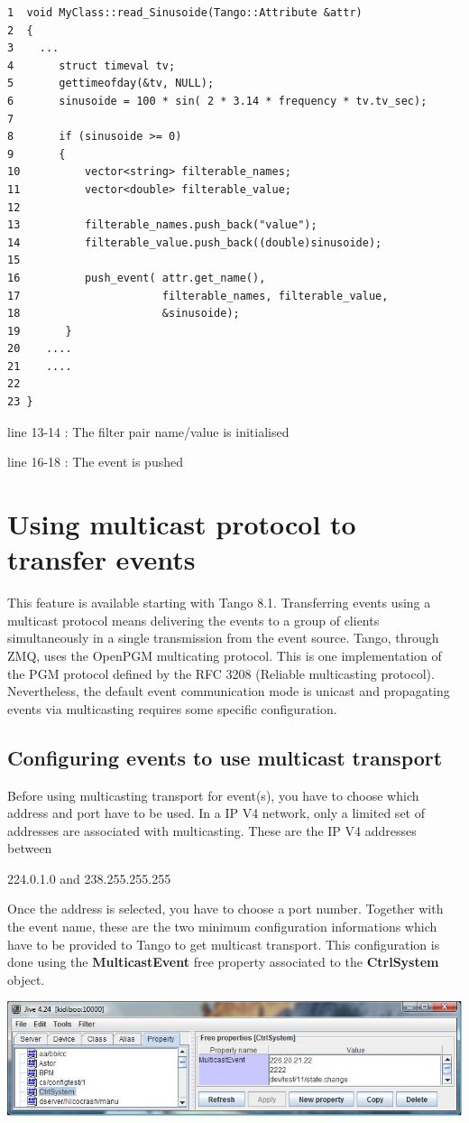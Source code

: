 \begin{verbatim}
1  void MyClass::read_Sinusoide(Tango::Attribute &attr)
2  {
3    ...
4       struct timeval tv;
5       gettimeofday(&tv, NULL);
6       sinusoide = 100 * sin( 2 * 3.14 * frequency * tv.tv_sec);
7  
8       if (sinusoide >= 0) 
9       {
10          vector<string> filterable_names;
11          vector<double> filterable_value;
12 
13          filterable_names.push_back("value");
14          filterable_value.push_back((double)sinusoide);
15 
16          push_event( attr.get_name(),
17                      filterable_names, filterable_value,
18                      &sinusoide);
19       }
20    ....
21    ....
22 
23 }
\end{verbatim}


line 13-14 : The filter pair name/value is initialised

line 16-18 : The event is pushed


\section{Using multicast protocol to transfer events}

This feature is available starting with Tango 8.1. Transferring events
using a multicast protocol means delivering the
events to a group of clients simultaneously in a single transmission
from the event source. Tango, through ZMQ, uses the OpenPGM multicating
protocol. This is one implementation of the PGM protocol defined by
the RFC 3208 (Reliable multicasting protocol). Nevertheless, the default
event communication mode is unicast and propagating events via multicasting
requires some specific configuration.


\subsection{Configuring events to use multicast transport}

Before using multicasting transport for event(s), you have to choose
which address and port have to be used. In a IP V4 network, only a
limited set of addresses are associated with multicasting. These are
the IP V4 addresses between \begin{center}224.0.1.0 and 238.255.255.255\end{center}
Once the address is selected, you have to choose a port number. Together
with the event name, these are the two minimum configuration informations
which have to be provided to Tango to get multicast transport. This
configuration is done using the \textbf{MulticastEvent}
free property associated to the \textbf{CtrlSystem}
object. \begin{center}

\includegraphics[scale=0.7]{advanced/jive_simpl}\end{center}

